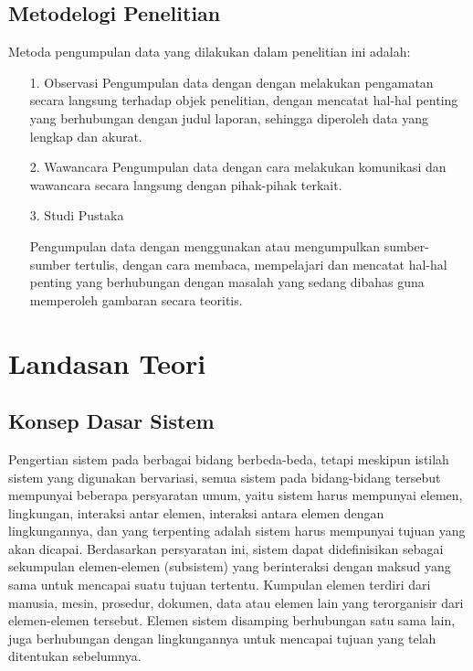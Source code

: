 \documentclass{jtetiproposalskripsi}
\begin{document}
\section{Metodelogi Penelitian}
Metoda pengumpulan data yang dilakukan dalam penelitian ini adalah:
\begin{itemize}
\item[1.]Observasi
Pengumpulan data dengan dengan melakukan pengamatan secara langsung terhadap objek penelitian, dengan mencatat hal-hal penting yang berhubungan dengan judul laporan, sehingga diperoleh data yang lengkap dan akurat.

\item[2.]Wawancara
Pengumpulan data dengan cara melakukan komunikasi dan wawancara secara langsung dengan pihak-pihak terkait.

\item[3.]Studi Pustaka

Pengumpulan data dengan menggunakan atau mengumpulkan sumber-sumber tertulis, dengan cara membaca, mempelajari dan mencatat hal-hal penting yang berhubungan dengan masalah yang sedang dibahas guna memperoleh gambaran secara teoritis.
\end{itemize}


\chapter{Landasan Teori}          
\section{Konsep Dasar Sistem}      
Pengertian sistem pada berbagai bidang berbeda-beda, tetapi meskipun
istilah sistem yang digunakan bervariasi, semua sistem pada bidang-bidang tersebut mempunyai beberapa persyaratan umum, yaitu sistem harus mempunyai elemen, lingkungan, interaksi antar elemen, interaksi antara elemen dengan lingkungannya, dan yang terpenting adalah sistem harus mempunyai tujuan yang akan dicapai. Berdasarkan persyaratan ini, sistem dapat didefinisikan sebagai sekumpulan elemen-elemen (subsistem) yang berinteraksi dengan maksud yang sama untuk mencapai suatu tujuan tertentu. Kumpulan elemen terdiri dari manusia, mesin, prosedur, dokumen, data atau elemen lain yang terorganisir dari elemen-elemen tersebut. Elemen sistem disamping berhubungan satu sama lain, juga berhubungan dengan lingkungannya untuk mencapai tujuan yang telah ditentukan sebelumnya. 
\end{document}
